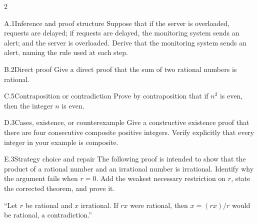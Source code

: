 \documentclass[9pt]{extarticle}
\begin{document}
\begin{multicols}{2}
\begin{CoreProblem}{A.1}{Inference and proof structure}
Suppose that if the server is overloaded, requests are delayed; if requests are
delayed, the monitoring system sends an alert; and the server is overloaded.
Derive that the monitoring system sends an alert, naming the rule used at each
step.
\end{CoreProblem}
\begin{CoreProblem}{B.2}{Direct proof}
Give a direct proof that the sum of two rational numbers is rational.
\end{CoreProblem}
\begin{CoreProblem}{C.5}{Contraposition or contradiction}
Prove by contraposition that if $n^2$ is even, then the integer $n$ is even.
\end{CoreProblem}
\columnbreak
\begin{CoreProblem}{D.3}{Cases, existence, or counterexample}
Give a constructive existence proof that there are four consecutive composite
positive integers. Verify explicitly that every integer in your example is
composite.
\end{CoreProblem}
\begin{CoreProblem}{E.3}{Strategy choice and repair}
The following proof is intended to show that the product of a rational number
and an irrational number is irrational. Identify why the argument fails when
$r=0$. Add the weakest necessary restriction on $r$, state the corrected
theorem, and prove it.

``Let $r$ be rational and $x$ irrational. If $rx$ were rational, then $x=(rx)/r$ would be rational, a contradiction.''
\end{CoreProblem}
\end{multicols}
\CoreWorkArea
\FormBreak
{}
\end{document}
